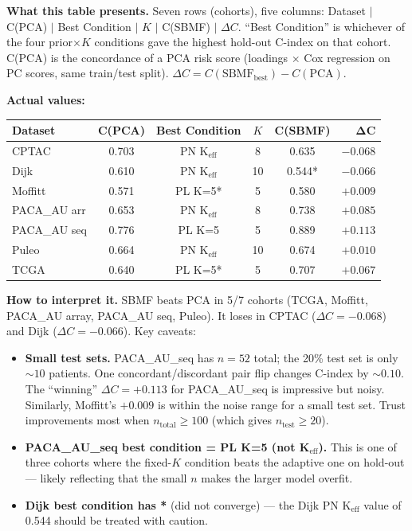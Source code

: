 \documentclass[11pt]{article}
\begin{document}
\textbf{What this table presents.} Seven rows (cohorts), five columns: Dataset $|$ C(PCA) $|$ Best Condition $|$ $K$ $|$ C(SBMF) $|$ $\Delta C$. ``Best Condition'' is whichever of the four prior$\times K$ conditions gave the highest hold-out C-index on that cohort. C(PCA) is the concordance of a PCA risk score (loadings $\times$ Cox regression on PC scores, same train/test split). $\Delta C = C(\text{SBMF}_\text{best}) - C(\text{PCA})$.

\textbf{Actual values:}
\begin{center}
\begin{tabular}{lccccr}
\textbf{Dataset} & \textbf{C(PCA)} & \textbf{Best Condition} & \textbf{$K$} & \textbf{C(SBMF)} & $\boldsymbol{\Delta C}$ \\
\hline
CPTAC        & 0.703 & PN K$_\text{eff}$  & 8  & 0.635  & $-0.068$ \\
Dijk         & 0.610 & PN K$_\text{eff}$  & 10 & 0.544* & $-0.066$ \\
Moffitt      & 0.571 & PL K=5*            & 5  & 0.580  & $+0.009$ \\
PACA\_AU arr & 0.653 & PN K$_\text{eff}$  & 8  & 0.738  & $+0.085$ \\
PACA\_AU seq & 0.776 & PL K=5             & 5  & 0.889  & $+0.113$ \\
Puleo        & 0.664 & PN K$_\text{eff}$  & 10 & 0.674  & $+0.010$ \\
TCGA         & 0.640 & PL K=5*            & 5  & 0.707  & $+0.067$ \\
\end{tabular}
\end{center}

\textbf{How to interpret it.} SBMF beats PCA in 5/7 cohorts (TCGA, Moffitt, PACA\_AU array, PACA\_AU seq, Puleo). It loses in CPTAC ($\Delta C = -0.068$) and Dijk ($\Delta C = -0.066$). Key caveats:

\begin{itemize}
  \item \textbf{Small test sets.} PACA\_AU\_seq has $n = 52$ total; the 20\% test set is only $\sim 10$ patients. One concordant/discordant pair flip changes C-index by $\sim 0.10$. The ``winning'' $\Delta C = +0.113$ for PACA\_AU\_seq is impressive but noisy. Similarly, Moffitt's $+0.009$ is within the noise range for a small test set. Trust improvements most when $n_\text{total} \geq 100$ (which gives $n_\text{test} \geq 20$).
  \item \textbf{PACA\_AU\_seq best condition = PL K=5 (not K$_\text{eff}$).} This is one of three cohorts where the fixed-$K$ condition beats the adaptive one on hold-out --- likely reflecting that the small $n$ makes the larger model overfit.
  \item \textbf{Dijk best condition has *} (did not converge) --- the Dijk PN K$_\text{eff}$ value of 0.544 should be treated with caution.
\end{itemize}
\end{document}
